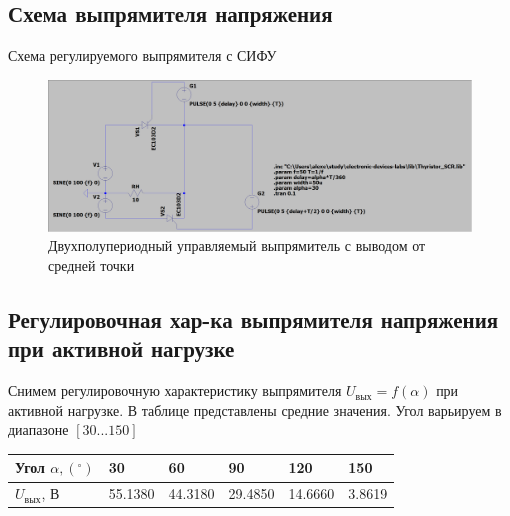 \documentclass[a4paper, 12pt]{article}
\begin{document}
    \subsection{Схема выпрямителя напряжения}
    Схема регулируемого выпрямителя с СИФУ
    \begin{figure}[H]
        \centering
        \includegraphics[scale=0.22]{scheme1.png}
        \captionsetup{skip=0pt}
        \caption{Двухполупериодный управляемый выпрямитель с выводом от средней точки}
        \label{fig:scheme1}
    \end{figure}


    \subsection{Регулировочная хар-ка выпрямителя напряжения при активной нагрузке}
    Снимем регулировочную характеристику выпрямителя $U_{\text{вых}}=f\left( \alpha \right)$ при активной нагрузке.
    В таблице представлены средние значения. Угол варьируем в диапазоне $\left[ 30...150 \right]$
    \begin{center}
    \begin{tabular}{ | m{5em} | m{1.5cm}| m{1.5cm} | m{1.5cm} | m{1.5cm} | m{1.5cm} | } 
    \hline
    Угол $\alpha,\left(^\circ\right)$& 30 & 60 & 90 &120 &150 \\ 
    \hline
    $U_{\text{вых}}$, В& 55.1380 & 44.3180 & 29.4850 &14.6660 &3.8619\\ 
    \hline
    \end{tabular}
    \end{center}
\end{document}
